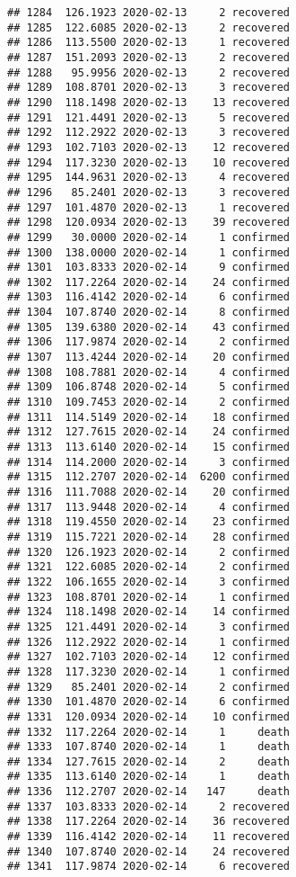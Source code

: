 \documentclass[
]{article}
\begin{document}
\begin{verbatim}
## 1284  126.1923 2020-02-13     2 recovered
## 1285  122.6085 2020-02-13     2 recovered
## 1286  113.5500 2020-02-13     1 recovered
## 1287  151.2093 2020-02-13     2 recovered
## 1288   95.9956 2020-02-13     2 recovered
## 1289  108.8701 2020-02-13     3 recovered
## 1290  118.1498 2020-02-13    13 recovered
## 1291  121.4491 2020-02-13     5 recovered
## 1292  112.2922 2020-02-13     3 recovered
## 1293  102.7103 2020-02-13    12 recovered
## 1294  117.3230 2020-02-13    10 recovered
## 1295  144.9631 2020-02-13     4 recovered
## 1296   85.2401 2020-02-13     3 recovered
## 1297  101.4870 2020-02-13     1 recovered
## 1298  120.0934 2020-02-13    39 recovered
## 1299   30.0000 2020-02-14     1 confirmed
## 1300  138.0000 2020-02-14     1 confirmed
## 1301  103.8333 2020-02-14     9 confirmed
## 1302  117.2264 2020-02-14    24 confirmed
## 1303  116.4142 2020-02-14     6 confirmed
## 1304  107.8740 2020-02-14     8 confirmed
## 1305  139.6380 2020-02-14    43 confirmed
## 1306  117.9874 2020-02-14     2 confirmed
## 1307  113.4244 2020-02-14    20 confirmed
## 1308  108.7881 2020-02-14     4 confirmed
## 1309  106.8748 2020-02-14     5 confirmed
## 1310  109.7453 2020-02-14     2 confirmed
## 1311  114.5149 2020-02-14    18 confirmed
## 1312  127.7615 2020-02-14    24 confirmed
## 1313  113.6140 2020-02-14    15 confirmed
## 1314  114.2000 2020-02-14     3 confirmed
## 1315  112.2707 2020-02-14  6200 confirmed
## 1316  111.7088 2020-02-14    20 confirmed
## 1317  113.9448 2020-02-14     4 confirmed
## 1318  119.4550 2020-02-14    23 confirmed
## 1319  115.7221 2020-02-14    28 confirmed
## 1320  126.1923 2020-02-14     2 confirmed
## 1321  122.6085 2020-02-14     2 confirmed
## 1322  106.1655 2020-02-14     3 confirmed
## 1323  108.8701 2020-02-14     1 confirmed
## 1324  118.1498 2020-02-14    14 confirmed
## 1325  121.4491 2020-02-14     3 confirmed
## 1326  112.2922 2020-02-14     1 confirmed
## 1327  102.7103 2020-02-14    12 confirmed
## 1328  117.3230 2020-02-14     1 confirmed
## 1329   85.2401 2020-02-14     2 confirmed
## 1330  101.4870 2020-02-14     6 confirmed
## 1331  120.0934 2020-02-14    10 confirmed
## 1332  117.2264 2020-02-14     1     death
## 1333  107.8740 2020-02-14     1     death
## 1334  127.7615 2020-02-14     2     death
## 1335  113.6140 2020-02-14     1     death
## 1336  112.2707 2020-02-14   147     death
## 1337  103.8333 2020-02-14     2 recovered
## 1338  117.2264 2020-02-14    36 recovered
## 1339  116.4142 2020-02-14    11 recovered
## 1340  107.8740 2020-02-14    24 recovered
## 1341  117.9874 2020-02-14     6 recovered

\end{verbatim}
\end{document}
